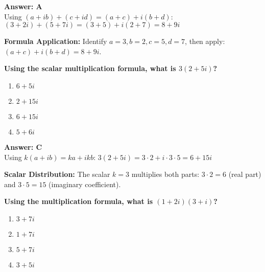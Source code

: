 \documentclass[12pt,a4paper]{article}
\begin{document}
\begin{answerstyle}
\textbf{Answer: A} \\
Using \( (a + ib) + (c + id) = (a + c) + i(b + d) \): \( (3 + 2i) + (5 + 7i) = (3 + 5) + i(2 + 7) = 8 + 9i \)
\end{answerstyle}

\begin{conceptbox}
\textbf{Formula Application:} Identify \( a = 3, b = 2, c = 5, d = 7 \), then apply: \( (a + c) + i(b + d) = 8 + 9i \).
\end{conceptbox}

\newpage
\begin{questiontitle}[MCQ 46]
\textbf{Using the scalar multiplication formula, what is \( 3(2 + 5i) \)?}
\end{questiontitle}

\begin{partbox}[Options]
\begin{enumerate}[label=\Alph*.]
    \item \( 6 + 5i \)
    \item \( 2 + 15i \)
    \item \( 6 + 15i \)
    \item \( 5 + 6i \)
\end{enumerate}
\end{partbox}

\begin{answerstyle}
\textbf{Answer: C} \\
Using \( k(a + ib) = ka + ikb \): \( 3(2 + 5i) = 3 \cdot 2 + i \cdot 3 \cdot 5 = 6 + 15i \)
\end{answerstyle}

\begin{conceptbox}
\textbf{Scalar Distribution:} The scalar \( k = 3 \) multiplies both parts: \( 3 \cdot 2 = 6 \) (real part) and \( 3 \cdot 5 = 15 \) (imaginary coefficient).
\end{conceptbox}

\newpage
\begin{questiontitle}[MCQ 47]
\textbf{Using the multiplication formula, what is \( (1 + 2i)(3 + i) \)?}
\end{questiontitle}

\begin{partbox}[Options]
\begin{enumerate}[label=\Alph*.]
    \item \( 3 + 7i \)
    \item \( 1 + 7i \)
    \item \( 5 + 7i \)
    \item \( 3 + 5i \)
\end{enumerate}
\end{partbox}
\end{document}
